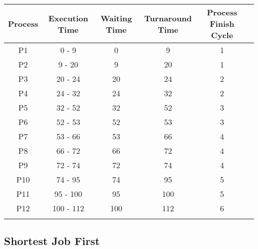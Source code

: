\documentclass{article}
\begin{document}
\bigskip

\begin{center}
    \begin{tabular}{|c|c|c|c|c|c|}
    \hline
    \rowcolor{darkblue}
    {\textbf{Process}} &{\textbf{Execution Time}} & {\textbf{Waiting Time}} & {\textbf{Turnaround Time}} & {\textbf{Process Finish Cycle}} \\
    \hline \rowcolor{lightblue}
    P1 & 0 - 9 & 0 & 9 & 1\\
    \hline
    P2 & 9 - 20 & 9 & 20 & 1 \\
    \hline \rowcolor{lightblue}
    P3 & 20 - 24 & 20 & 24 & 2 \\
    \hline
    P4 & 24 - 32 & 24 & 32 & 2 \\
    \hline \rowcolor{lightblue}
    P5 & 32 - 52 & 32 & 52 & 3 \\
    \hline
    P6 & 52 - 53 & 52 & 53 & 3 \\
    \hline \rowcolor{lightblue}
    P7 & 53 - 66 & 53 & 66 & 4 \\
    \hline
    P8 & 66 - 72 & 66 & 72 & 4 \\
    \hline \rowcolor{lightblue}
    P9 & 72 - 74 & 72 & 74 & 4 \\
    \hline
    P10 & 74 - 95 & 74 & 95 & 5 \\
    \hline \rowcolor{lightblue}
    P11 & 95 - 100 & 95 & 100 & 5 \\
    \hline
    P12 & 100 - 112 & 100 & 112 & 6 \\
    \hline \rowcolor{lightblue}
    \end{tabular}
\end{center}

\subsection{Shortest Job First}
\end{document}
